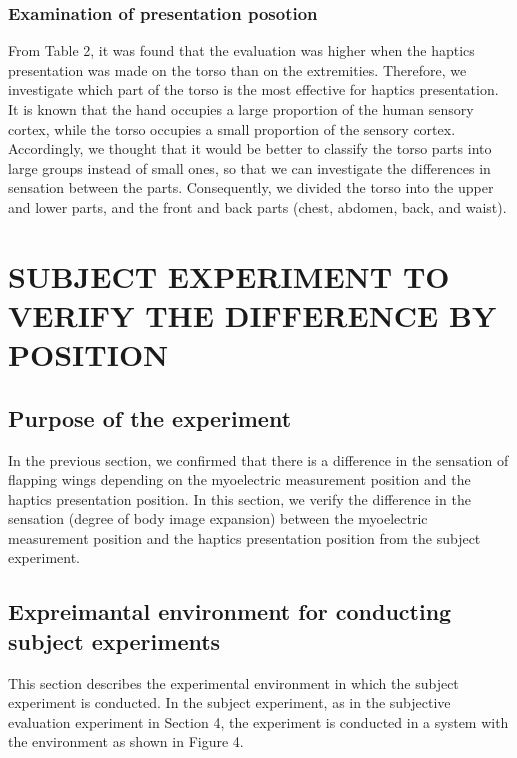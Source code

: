 \documentclass[letterpaper, 10 pt, conference]{ieeeconf}  %
\begin{document}
                \subsubsection{Examination of presentation posotion}
                        From Table 2, it was found that the evaluation was higher when the haptics presentation was made on the torso than on the extremities. 
                        Therefore, we investigate which part of the torso is the most effective for haptics presentation. 
                        It is known that the hand occupies a large proportion of the human sensory cortex, while the torso occupies a small proportion of the sensory cortex\cite{penfield1950cerebral}. 
                        Accordingly, we thought that it would be better to classify the torso parts into large groups instead of small ones, so that we can investigate the differences in sensation between the parts. 
                        Consequently, we divided the torso into the upper and lower parts, and the front and back parts (chest, abdomen, back, and waist).        


\section{SUBJECT EXPERIMENT TO VERIFY THE DIFFERENCE BY POSITION}

        \subsection{Purpose of the experiment}
                In the previous section, we confirmed that there is a difference in the sensation of flapping wings depending on the myoelectric measurement position and the haptics presentation position.  
                In this section, we verify the difference in the sensation (degree of body image expansion) between the myoelectric measurement position and the haptics presentation position from the subject experiment.  

        \subsection{Expreimantal environment for conducting subject experiments}
                This section describes the experimental environment in which the subject experiment is conducted.  
                In the subject experiment, as in the subjective evaluation experiment in Section 4, the experiment is conducted in a system with the environment as shown in Figure 4.  
\end{document}
